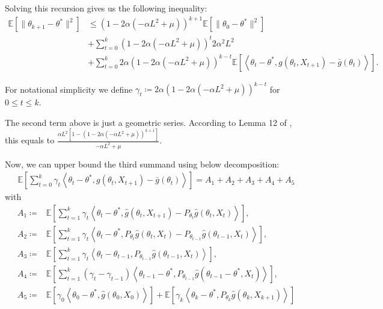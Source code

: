 \documentclass[a4paper]{article}
\newcommand{\norm}[1]{\|#1 \|}
\newcommand{\Exs}{\mathbb{E}}
\newcommand{\thetastar}{\theta^*}
\newcommand{\stepsize}{\alpha}
\begin{document}
	Solving this recursion gives us the following inequality:
	\begin{align*}
		\Exs\left[\norm{\theta_{k + 1} - \thetastar}^{2}\right] & \le \left(1 - 2\stepsize\left(-\stepsize L^{2} + \mu\right)\right)^{k + 1}\Exs\left[\norm{\theta_{0} - \thetastar}^{2}\right] \\
		& + \sum_{t = 0}^{k}\left(1 - 2\stepsize\left(-\stepsize L^{2} + \mu\right)\right)^{t}2\stepsize^{2}L^{2} \\
		& + \sum_{t = 0}^{k}2\stepsize\left(1 - 2\stepsize\left(-\stepsize L^{2} + \mu\right)\right)^{k - t}\Exs\left[\left\langle \theta_{t} - \thetastar, g\left(\theta_{t}, X_{t + 1}\right) - \bar{g}\left(\theta_{t}\right) \right\rangle\right].
	\end{align*}
	
	For notational simplicity we define $\gamma_{t} \coloneq 2\stepsize\left(1 - 2\stepsize\left(-\stepsize L^{2} + \mu\right)\right)^{k - t}$ for $0 \le t \le k$.
	
	The second term above is just a geometric series. According to Lemma 12 of \cite{kaledin2020finite}, this equals to $\frac{\stepsize L^{2}\left[1 - \left(1 - 2\stepsize\left(-\stepsize L^{2} + \mu\right)\right)^{k + 1}\right]}{-\stepsize L^{2} + \mu}$.
	
	Now, we can upper bound the third summand using below decomposition:
	\begin{align*}
		\Exs\left[ \sum_{t = 0}^{k} \gamma_{t}\left\langle \theta_{t} - \thetastar, g(\theta_{t}, X_{t + 1}) - \bar{g}(\theta_{t}) \right\rangle \right] = A_{1} + A_{2} + A_{3} + A_{4} + A_{5}
	\end{align*}
	with
	\begin{align*}
		A_{1} \coloneq & \Exs\left[\sum_{t = 1}^{k}\gamma_{t}\left\langle \theta_{t} - \thetastar, \hat{g}\left(\theta_{t}, X_{t + 1}\right) - P_{\theta_{t}}\hat{g}\left(\theta_{t}, X_{t}\right) \right\rangle\right],\\
		A_{2} \coloneq & \Exs\left[\sum_{t = 1}^{k}\gamma_{t}\left\langle \theta_{t} - \thetastar, P_{\theta_{t}}\hat{g}\left(\theta_{t}, X_{t}\right) - P_{\theta_{t - 1}}\hat{g}\left( \theta_{t - 1}, X_{t} \right) \right\rangle\right],\\
		A_{3} \coloneq & \Exs\left[\sum_{t = 1}^{k}\gamma_{t}\left\langle \theta_{t} - \theta_{t - 1}, P_{\theta_{t - 1}}\hat{g}\left( \theta_{t - 1}, X_{t}\right) \right\rangle\right],\\
		A_{4} \coloneq & \Exs\left[\sum_{t = 1}^{k}\left(\gamma_{t} - \gamma_{t - 1}\right)\left\langle \theta_{t - 1} - \thetastar, P_{\theta_{t - 1}}\hat{g}\left( \theta_{t - 1} - \thetastar, X_{t}\right) \right\rangle\right],\\
		A_{5} \coloneq & \Exs\left[\gamma_{0}\left\langle \theta_{0} - \thetastar, \hat{g}\left(\theta_{0}, X_{0}\right) \right\rangle\right] + \Exs\left[\gamma_{k}\left\langle \theta_{k} - \thetastar, P_{\theta_{k}}\hat{g}\left(\theta_{k}, X_{k + 1}\right)\right\rangle\right]
	\end{align*}
	
\end{document}
